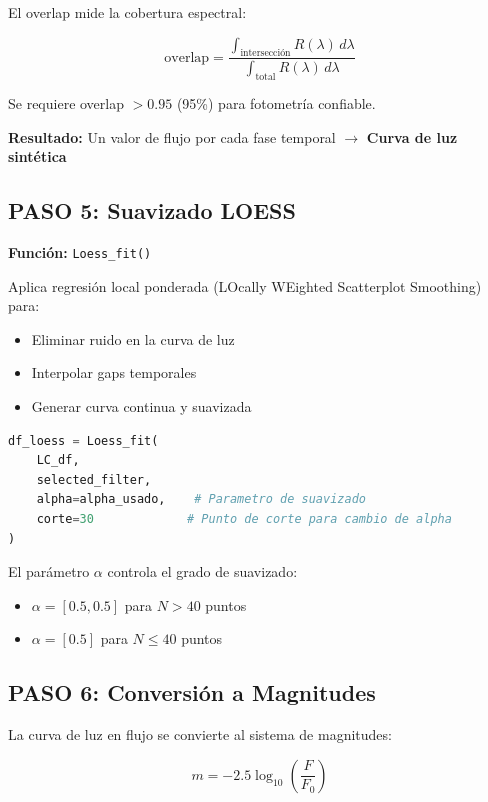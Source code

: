\documentclass[11pt,a4paper]{article}
\begin{document}
El overlap mide la cobertura espectral:

\begin{equation}
\text{overlap} = \frac{\int_{\text{intersección}} R(\lambda) \, d\lambda}{\int_{\text{total}} R(\lambda) \, d\lambda}
\end{equation}

Se requiere overlap $> 0.95$ (95\%) para fotometría confiable.

\textbf{Resultado:} Un valor de flujo por cada fase temporal $\rightarrow$ \textbf{Curva de luz sintética}

\subsection{PASO 5: Suavizado LOESS}

\textbf{Función:} \texttt{Loess\_fit()}

Aplica regresión local ponderada (LOcally WEighted Scatterplot Smoothing) para:
\begin{itemize}
    \item Eliminar ruido en la curva de luz
    \item Interpolar gaps temporales
    \item Generar curva continua y suavizada
\end{itemize}

\begin{lstlisting}[language=Python, caption=Suavizado LOESS]
df_loess = Loess_fit(
    LC_df, 
    selected_filter,
    alpha=alpha_usado,    # Parametro de suavizado
    corte=30             # Punto de corte para cambio de alpha
)
\end{lstlisting}

El parámetro $\alpha$ controla el grado de suavizado:
\begin{itemize}
    \item $\alpha = [0.5, 0.5]$ para $N > 40$ puntos
    \item $\alpha = [0.5]$ para $N \leq 40$ puntos
\end{itemize}

\subsection{PASO 6: Conversión a Magnitudes}

La curva de luz en flujo se convierte al sistema de magnitudes:

\begin{equation}
m = -2.5 \log_{10}\left(\frac{F}{F_0}\right)
\end{equation}
\end{document}
